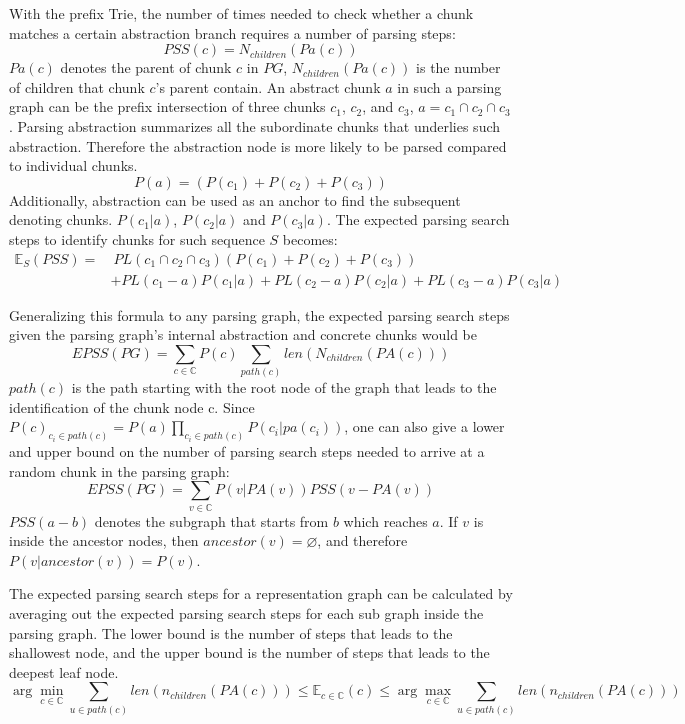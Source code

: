 \documentclass{article} %
\theoremstyle{remark}
\begin{document}
With the prefix Trie, the number of times needed to check whether a chunk matches a certain abstraction branch requires a number of parsing steps:
\begin{equation}
    PSS(c) = N_{children}(Pa(c))
\end{equation}
$Pa(c)$ denotes the parent of chunk $c$ in $PG$, $N_{children}(Pa(c))$ is the number of children that chunk $c$'s parent contain.  
An abstract chunk $a$ in such a parsing graph can be the prefix intersection of three chunks $c_1$, $c_2$, and $c_3$, $a = c_1 \cap c_2 \cap c_3$.
Parsing abstraction summarizes all the subordinate chunks that underlies such abstraction. Therefore the abstraction node is more likely to be parsed compared to individual chunks. 
\[P(a) = (P(c_1) + P(c_2) + P(c_3))\]
Additionally, abstraction can be used as an anchor to find the subsequent denoting chunks. $P(c_1|a)$, $P(c_2|a)$ and $P(c_3|a)$. The expected parsing search steps to identify chunks for such sequence $S$ becomes:
\begin{align*}
\mathbb{E}_{S}(PSS) = &\ PL(c_1 \cap c_2 \cap c_3)(P(c_1) + P(c_2) + P(c_3)) \\
& + PL(c_1 - a)P(c_1|a)  + PL(c_2 - a)P(c_2|a) + PL(c_3 - a)P(c_3|a)
\end{align*}


Generalizing this formula to any parsing graph, the expected parsing search steps given the parsing graph's internal abstraction and concrete chunks would be
\begin{equation}
    EPSS(PG) = \sum_{c \in \mathbb{C}}P(c) \sum_{path(c)} len(N_{children}(PA(c)))
\end{equation}
$path(c)$ is the path starting with the root node of the graph that leads to the identification of the chunk node c. Since $P(c)_{c_i \in path(c)} = P(a)\prod_{c_i \in path(c)} P(c_i|pa(c_i))$, one can also give a lower and upper bound on the number of parsing search steps needed to arrive at a random chunk in the parsing graph:
\begin{equation}
    EPSS(PG) = \sum_{v\in \mathbb{C}} P(v|PA(v)) PSS(v - PA(v)) 
\end{equation}
$PSS(a - b)$ denotes the subgraph that starts from $b$ which reaches $a$. 
If $v$ is inside the ancestor nodes, then $ancestor(v) = \varnothing$, and therefore $P(v|ancestor(v)) = P(v)$. 

The expected parsing search steps for a representation graph can be calculated by averaging out the expected parsing search steps for each sub graph inside the parsing graph. The lower bound is the number of steps that leads to the shallowest node, and the upper bound is the number of steps that leads to the deepest leaf node. 
\begin{equation}
\arg\min_{c \in \mathbb{C}} \sum_{u \in path(c)} len(n_{children}(PA(c))) \leq \mathbb{E}_{c\in \mathbb{C}}(c) \leq \arg\max_{c \in \mathbb{C}} \sum_{u \in path(c)} len(n_{children}(PA(c)))    
\end{equation}
\end{document}
